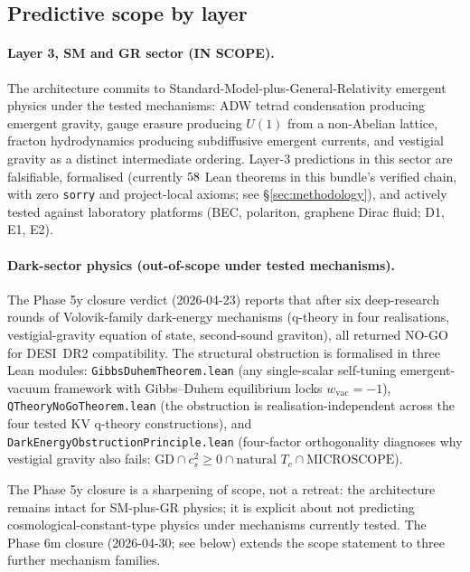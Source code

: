 \documentclass[aps,prd,reprint,nofootinbib,superscriptaddress]{revtex4-2}
\begin{document}
\subsection{Predictive scope by layer}

\paragraph{Layer 3, SM and GR sector (IN SCOPE).} The architecture
commits to Standard-Model-plus-General-Relativity emergent physics
under the tested mechanisms: ADW tetrad condensation producing
emergent gravity, gauge erasure producing $U(1)$ from a non-Abelian
lattice, fracton hydrodynamics producing subdiffusive emergent
currents, and vestigial gravity as a distinct intermediate ordering.
Layer-3 predictions in this sector are falsifiable, formalised
(currently $58$ Lean theorems in this bundle's verified
chain, with zero \texttt{sorry} and \axiomcount{} project-local axioms; see
\S\ref{sec:methodology}), and
actively tested against laboratory platforms (BEC, polariton, graphene
Dirac fluid; D1, E1, E2).

\paragraph{Dark-sector physics (out-of-scope under tested
mechanisms).} The Phase 5y closure verdict (2026-04-23) reports that
after six deep-research rounds of Volovik-family dark-energy
mechanisms (q-theory in four realisations, vestigial-gravity equation
of state, second-sound graviton), all returned NO-GO for DESI~DR2
compatibility. The structural obstruction is formalised in three Lean
modules: \texttt{GibbsDuhemTheorem.lean} (any single-scalar
self-tuning emergent-vacuum framework with Gibbs--Duhem equilibrium
locks $w_{\mathrm{vac}} = -1$), \texttt{QTheoryNoGoTheorem.lean} (the
obstruction is realisation-independent across the four tested KV
q-theory constructions), and
\texttt{DarkEnergyObstructionPrinciple.lean} (four-factor orthogonality
diagnoses why vestigial gravity also fails:
$\text{GD} \cap c_s^{2}\!\geq\!0 \cap \text{natural }T_c \cap
\text{MICROSCOPE}$).

The Phase 5y closure is a sharpening of scope, not a retreat: the
architecture remains intact for SM-plus-GR physics; it is explicit
about not predicting cosmological-constant-type physics under
mechanisms currently tested. The Phase 6m closure (2026-04-30; see
below) extends the scope statement to three further mechanism families.
\end{document}
